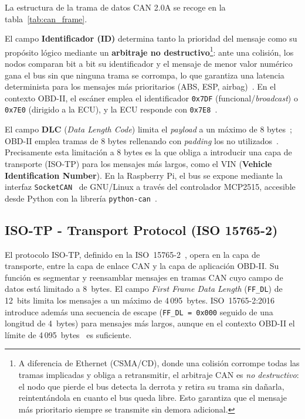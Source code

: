 La estructura de la trama de datos CAN 2.0A se recoge en la tabla~\ref{tab:can_frame}.

\begin{table}[!htbp]
\caption{Estructura de la trama CAN 2.0A (\textit{Standard Frame Format}) según ISO~11898-1~\cite{ISO11898-1:2024}.}
\label{tab:can_frame}

\end{table}

El campo \textbf{Identificador (ID)} determina tanto la prioridad del mensaje como su propósito lógico mediante un \textbf{arbitraje no destructivo}\footnote{A diferencia de Ethernet (CSMA/CD), donde una colisión corrompe todas las tramas implicadas y obliga a retransmitir, el arbitraje CAN es \textit{no destructivo}: el nodo que pierde el bus detecta la derrota y retira su trama sin dañarla, reintentándola en cuanto el bus queda libre. Esto garantiza que el mensaje más prioritario siempre se transmite sin demora adicional.}: ante una colisión, los nodos comparan bit a bit su identificador y el mensaje de menor valor numérico gana el bus sin que ninguna trama se corrompa, lo que garantiza una latencia determinista para los mensajes más prioritarios (ABS, ESP, airbag)~\cite{ISO11898-1:2024}. En el contexto OBD-II, el escáner emplea el identificador \texttt{0x7DF} (funcional/\textit{broadcast}) o \texttt{0x7E0} (dirigido a la ECU), y la ECU responde con \texttt{0x7E8}~\cite{ISO15765-4:2021}.

El campo \textbf{DLC} (\textit{Data Length Code}) limita el \textit{payload} a un máximo de 8 bytes~\cite{ISO11898-1:2024}; OBD-II emplea tramas de 8 bytes rellenando con \textit{padding} los no utilizados~\cite{ISO15765-4:2021}. Precisamente esta limitación a 8 bytes es la que obliga a introducir una capa de transporte (ISO-TP) para los mensajes más largos, como el VIN (\textbf{Vehicle Identification Number}). En la Raspberry Pi, el bus se expone mediante la interfaz \texttt{SocketCAN}~\cite{LinuxKernel_SocketCAN} de GNU/Linux a través del controlador MCP2515, accesible desde Python con la librería \texttt{python-can}~\cite{Twiss23-pythoncan}.

\subsection{ISO-TP - Transport Protocol (ISO 15765-2)}
\label{sec:proto_isotp}

El protocolo ISO-TP, definido en la ISO~15765-2~\cite{ISO15765-2:2016}, opera en la capa de transporte, entre la capa de enlace CAN y la capa de aplicación OBD-II. Su función es segmentar y reensamblar mensajes en tramas CAN cuyo campo de datos está limitado a 8~bytes. El campo \textit{First Frame Data Length} (\texttt{FF\_DL}) de 12~bits limita los mensajes a un máximo de 4\,095~bytes. ISO~15765-2:2016 introduce además una secuencia de escape (\texttt{FF\_DL = 0x000} seguido de una longitud de 4~bytes) para mensajes más largos, aunque en el contexto OBD-II el límite de 4\,095~bytes~\cite{ISO15765-2:2016} es suficiente.

